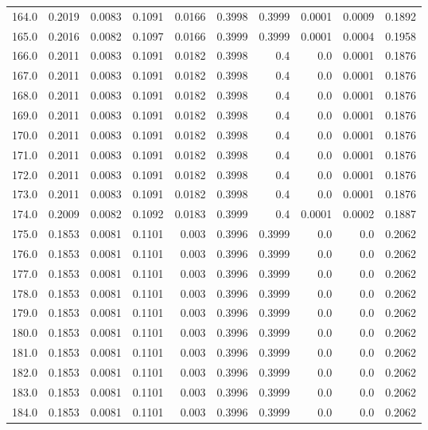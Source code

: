 \begin{longtable}{lrrrrrrrrr}
164.0 & 0.2019 & 0.0083 & 0.1091 & 0.0166 & 0.3998 & 0.3999 & 0.0001 & 0.0009 & 0.1892 \\
165.0 & 0.2016 & 0.0082 & 0.1097 & 0.0166 & 0.3999 & 0.3999 & 0.0001 & 0.0004 & 0.1958 \\
166.0 & 0.2011 & 0.0083 & 0.1091 & 0.0182 & 0.3998 & 0.4 & 0.0 & 0.0001 & 0.1876 \\
167.0 & 0.2011 & 0.0083 & 0.1091 & 0.0182 & 0.3998 & 0.4 & 0.0 & 0.0001 & 0.1876 \\
168.0 & 0.2011 & 0.0083 & 0.1091 & 0.0182 & 0.3998 & 0.4 & 0.0 & 0.0001 & 0.1876 \\
169.0 & 0.2011 & 0.0083 & 0.1091 & 0.0182 & 0.3998 & 0.4 & 0.0 & 0.0001 & 0.1876 \\
170.0 & 0.2011 & 0.0083 & 0.1091 & 0.0182 & 0.3998 & 0.4 & 0.0 & 0.0001 & 0.1876 \\
171.0 & 0.2011 & 0.0083 & 0.1091 & 0.0182 & 0.3998 & 0.4 & 0.0 & 0.0001 & 0.1876 \\
172.0 & 0.2011 & 0.0083 & 0.1091 & 0.0182 & 0.3998 & 0.4 & 0.0 & 0.0001 & 0.1876 \\
173.0 & 0.2011 & 0.0083 & 0.1091 & 0.0182 & 0.3998 & 0.4 & 0.0 & 0.0001 & 0.1876 \\
174.0 & 0.2009 & 0.0082 & 0.1092 & 0.0183 & 0.3999 & 0.4 & 0.0001 & 0.0002 & 0.1887 \\
175.0 & 0.1853 & 0.0081 & 0.1101 & 0.003 & 0.3996 & 0.3999 & 0.0 & 0.0 & 0.2062 \\
176.0 & 0.1853 & 0.0081 & 0.1101 & 0.003 & 0.3996 & 0.3999 & 0.0 & 0.0 & 0.2062 \\
177.0 & 0.1853 & 0.0081 & 0.1101 & 0.003 & 0.3996 & 0.3999 & 0.0 & 0.0 & 0.2062 \\
178.0 & 0.1853 & 0.0081 & 0.1101 & 0.003 & 0.3996 & 0.3999 & 0.0 & 0.0 & 0.2062 \\
179.0 & 0.1853 & 0.0081 & 0.1101 & 0.003 & 0.3996 & 0.3999 & 0.0 & 0.0 & 0.2062 \\
180.0 & 0.1853 & 0.0081 & 0.1101 & 0.003 & 0.3996 & 0.3999 & 0.0 & 0.0 & 0.2062 \\
181.0 & 0.1853 & 0.0081 & 0.1101 & 0.003 & 0.3996 & 0.3999 & 0.0 & 0.0 & 0.2062 \\
182.0 & 0.1853 & 0.0081 & 0.1101 & 0.003 & 0.3996 & 0.3999 & 0.0 & 0.0 & 0.2062 \\
183.0 & 0.1853 & 0.0081 & 0.1101 & 0.003 & 0.3996 & 0.3999 & 0.0 & 0.0 & 0.2062 \\
184.0 & 0.1853 & 0.0081 & 0.1101 & 0.003 & 0.3996 & 0.3999 & 0.0 & 0.0 & 0.2062 \\

\end{longtable}
